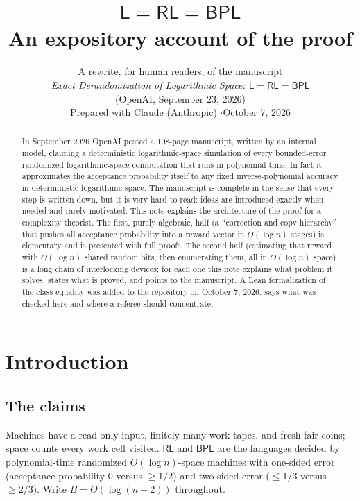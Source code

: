 \documentclass[11pt]{article}
\title{\textbf{$\mathsf L=\mathsf{RL}=\mathsf{BPL}$}\\[4pt]
\large An expository account of the proof}
\author{A rewrite, for human readers, of the manuscript\\ \emph{Exact Derandomization of
Logarithmic Space: $\mathsf L=\mathsf{RL}=\mathsf{BPL}$}\\
(OpenAI, September 23, 2026)\\[6pt]
\small Prepared with Claude (Anthropic) \quad$\cdot$\quad October 7, 2026}
\date{}
\theoremstyle{definition}
\theoremstyle{remark}
\newcommand{\RL}{\mathsf{RL}}
\newcommand{\BPL}{\mathsf{BPL}}
\begin{document}
\maketitle

\begin{abstract}
\noindent
In September 2026 OpenAI posted a 108-page manuscript, written by an internal
model, claiming a deterministic logarithmic-space simulation of every
bounded-error randomized logarithmic-space computation that runs in polynomial
time. In fact it approximates the acceptance probability itself to any fixed
inverse-polynomial accuracy in deterministic logarithmic space. The manuscript
is complete in the sense that every step is written down, but it is very hard
to read: ideas are introduced exactly when needed and rarely motivated. This
note explains the architecture of the proof for a complexity theorist. The
first, purely algebraic, half (a ``correction and copy hierarchy'' that pushes
all acceptance probability into a reward vector in $O(\log n)$ stages) is
elementary and is presented with full proofs. The second half (estimating that
reward with $O(\log n)$ shared random bits, then enumerating them, all in
$O(\log n)$ space) is a long chain of interlocking devices; for each one this
note explains what problem it solves, states what is proved, and points to the
manuscript. A Lean formalization of the class equality was added to the
repository on October 7, 2026.  says what was checked here and
where a referee should concentrate.
\end{abstract}

{\small\setlength{\parskip}{0pt}\tableofcontents}
\clearpage

\section{Introduction}\label{sec:intro}

\subsection{The claims}

Machines have a read-only input, finitely many work tapes, and fresh fair coins;
space counts every work cell visited. $\RL$ and $\BPL$ are the languages decided
by polynomial-time randomized $O(\log n)$-space machines with one-sided error
(acceptance probability $0$ versus $\ge1/2$) and two-sided error ($\le1/3$ versus
$\ge2/3$). Write $B=\Theta(\log(n+2))$ throughout.
\end{document}
